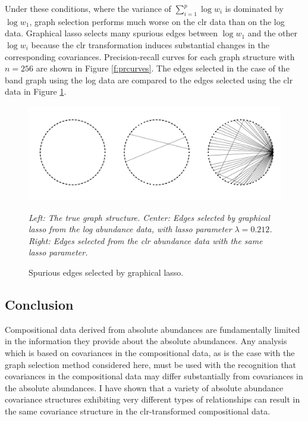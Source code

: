 \documentclass[10pt]{article}
\begin{document}
Under these conditions, where the variance of $\sum_{i=1}^p \log w_i$ is dominated by $\log w_1$, graph selection performs much worse on the clr data than on the log data. Graphical lasso selects many spurious edges between $\log w_1$ and the other $\log w_i$ because the clr transformation induces substantial changes in the corresponding covariances. Precision-recall curves for each graph structure with $n = 256$ are shown in Figure \ref{f:prcurves}. The edges selected in the case of the band graph using the log data are compared to the edges selected using the clr data in Figure \ref{f:spurious}.

\begin{figure}
\caption{Spurious edges selected by graphical lasso.}
\label{f:spurious}
\begin{center}
\includegraphics[width=6.5in]{figs/var-dom-band.pdf}
\begin{small}
\textit{Left: The true graph structure. Center: Edges selected by graphical lasso from the log abundance data, with lasso parameter $\lambda = 0.212$. Right: Edges selected from the clr abundance data with the same lasso parameter.}
\end{small}
\end{center}
\end{figure}

\subsection*{Conclusion}

Compositional data derived from absolute abundances are fundamentally limited in the information they provide about the absolute abundances. Any analysis which is based on covariances in the compositional data, as is the case with the graph selection method considered here, must be used with the recognition that covariances in the compositional data may differ substantially from covariances in the absolute abundances. I have shown that a variety of absolute abundance covariance structures exhibiting very different types of relationships can result in the same covariance structure in the clr-transformed compositional data.
\end{document}
